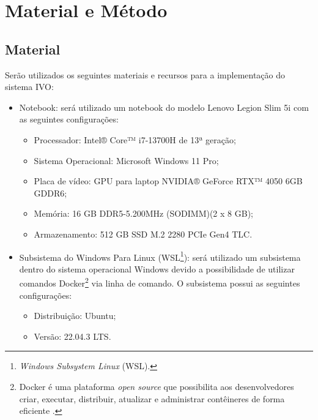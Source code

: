 \documentclass[
	12pt,				%
	a4paper,			%
	english,			%
	brazil,				%
	]{article}
\begin{document}

\section{Material e Método}

\subsection{Material}

Serão utilizados os seguintes materiais e recursos para a implementação do sistema IVO:

\begin{itemize}
	\item Notebook: será utilizado um notebook do modelo Lenovo Legion Slim 5i com as seguintes configurações:
		\begin{itemize}
			\item Processador: Intel® Core™ i7-13700H de 13ª geração;
			\item Sistema Operacional: Microsoft Windows 11 Pro;
			\item Placa de vídeo: GPU para laptop NVIDIA® GeForce RTX™ 4050 6GB GDDR6;
			\item Memória: 16 GB DDR5-5.200MHz (SODIMM)(2 x 8 GB);
			\item Armazenamento: 512 GB SSD M.2 2280 PCIe Gen4 TLC.
		\end{itemize}
		
	\item Subsistema do Windows Para Linux (WSL\footnote{\textit{Windows Subsystem Linux} (WSL).}): será utilizado um subsistema dentro do sistema operacional Windows devido a possibilidade de utilizar comandos Docker\footnote{Docker é uma plataforma \textit{open source} que possibilita aos desenvolvedores criar, executar, distribuir, atualizar e administrar contêineres de forma eficiente \cite{susnjara2024}.} via linha de comando. O subsistema possui as seguintes configurações:
		\begin{itemize}
			\item Distribuição: Ubuntu;
			\item Versão: 22.04.3 LTS.
		\end{itemize}
		

\end{itemize}
\end{document}
